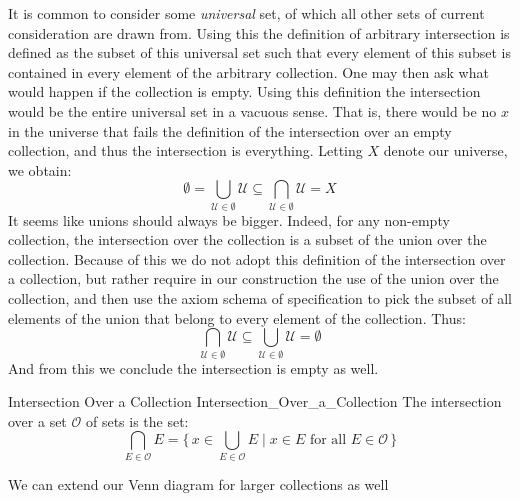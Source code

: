         It is common to consider some \textit{universal} set, of which all
        other sets of current consideration are drawn from. Using this the
        definition of arbitrary intersection is defined as the subset of
        this universal set such that every element of this subset is
        contained in every element of the arbitrary collection. One may then
        ask what would happen if the collection is empty. Using this
        definition the intersection would be the entire universal set
        in a vacuous sense. That is, there would be no $x$ in the universe
        that fails the definition of the intersection over an empty
        collection, and thus the intersection is everything. Letting $X$
        denote our universe, we obtain:
        \begin{equation}
            \emptyset=\bigcup_{\mathcal{U}\in\emptyset}\mathcal{U}
                \subseteq\bigcap_{\mathcal{U}\in\emptyset}\mathcal{U}
            =X
        \end{equation}
        It seems like unions should always be bigger. Indeed, for any
        non-empty collection, the intersection over the collection is a
        subset of the union over the collection. Because of this we do
        not adopt this definition of the intersection over a collection,
        but rather require in our construction the use of the union over
        the collection, and then use the axiom schema of specification to
        pick the subset of all elements of the union that belong to every
        element of the collection. Thus:
        \begin{equation}
            \bigcap_{\mathcal{U}\in\emptyset}\mathcal{U}
            \subseteq\bigcup_{\mathcal{U}\in\emptyset}\mathcal{U}
            =\emptyset
        \end{equation}
        And from this we conclude the intersection is empty as well.
        \begin{fdefinition}{Intersection Over a Collection}
                           {Intersection_Over_a_Collection}
            The \gls{intersection over a set} $\mathcal{O}$
            of sets is the set:
            \begin{equation*}
                \bigcap_{E\in\mathcal{O}}E
                =\Big\{\,x\in\bigcup_{E\in\mathcal{O}}E\;\Big|\;x\in{E}
                    \textrm{ for all }E\in\mathcal{O}\,\Big\}
            \end{equation*}
        \end{fdefinition}
        We can extend our Venn diagram for larger collections as well
